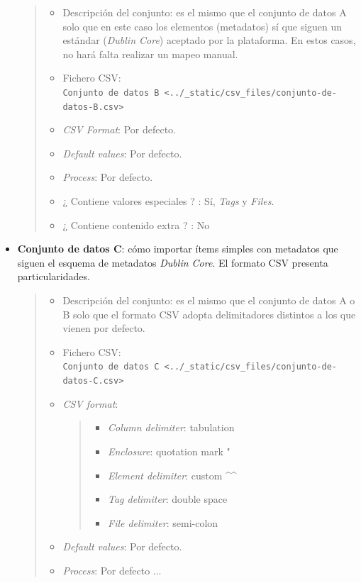 \documentclass[
]{article}
\providecommand{\tightlist}{%
  \setlength{\itemsep}{0pt}\setlength{\parskip}{0pt}}
\begin{document}
\begin{itemize}
  \begin{quote}
  \begin{itemize}
  \tightlist
  \item
    Descripción del conjunto: es el mismo que el conjunto de datos A
    solo que en este caso los elementos (metadatos) sí que siguen un
    estándar (\emph{Dublin Core}) aceptado por la plataforma. En estos
    casos, no hará falta realizar un mapeo manual.
  \item
    Fichero CSV:
    \texttt{Conjunto\ de\ datos\ B\ \textless{}../\_static/csv\_files/conjunto-de-datos-B.csv\textgreater{}}
  \item
    \emph{CSV Format}: Por defecto.
  \item
    \emph{Default values}: Por defecto.
  \item
    \emph{Process}: Por defecto.
  \item
    ¿ Contiene valores especiales ? : Sí, \emph{Tags} y \emph{Files}.
  \item
    ¿ Contiene contenido extra ? : No
  \end{itemize}
  \end{quote}
\item
  \textbf{Conjunto de datos C}: cómo importar ítems simples con
  metadatos que siguen el esquema de metadatos \emph{Dublin Core}. El
  formato CSV presenta particularidades.

  \begin{quote}
  \begin{itemize}
  \item
    Descripción del conjunto: es el mismo que el conjunto de datos A o B
    solo que el formato CSV adopta delimitadores distintos a los que
    vienen por defecto.
  \item
    Fichero CSV:
    \texttt{Conjunto\ de\ datos\ C\ \textless{}../\_static/csv\_files/conjunto-de-datos-C.csv\textgreater{}}
  \item
    \emph{CSV format}:

    \begin{quote}
    \begin{itemize}
    \tightlist
    \item
      \emph{Column delimiter}: tabulation
    \item
      \emph{Enclosure}: quotation mark "
    \item
      \emph{Element delimiter}: custom \^{}\^{}
    \item
      \emph{Tag delimiter}: double space
    \item
      \emph{File delimiter}: semi-colon
    \end{itemize}
    \end{quote}
  \item
    \emph{Default values}: Por defecto.
  \item
    \emph{Process}: Por defecto ...


\end{itemize}
\end{quote}
\end{itemize}
\end{document}
